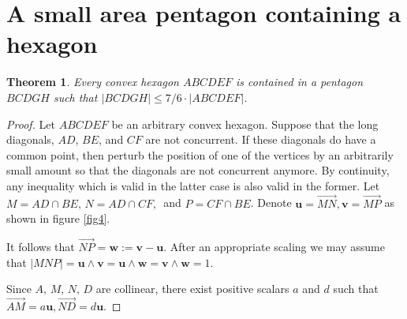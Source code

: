 \documentclass [10pt,oneside]{amsart}
\theoremstyle{definition}
\theoremstyle{plain}
\newtheorem{thm}[df]{Theorem}
\begin{document}
\section{\bf A small area pentagon containing a hexagon}
\begin{thm}\label{thmhexagon}
Every convex hexagon $ABCDEF$ is contained in a pentagon $BCDGH$ such that $|BCDGH| \le 7/6\cdot |ABCDEF|$.
\end{thm}

\begin{proof}
Let $ABCDEF$ be an arbitrary convex hexagon. Suppose that the long
diagonals, $AD$, $BE$, and $CF$ are not concurrent. If these
diagonals do have a common point, then perturb the position of one
of the vertices by an arbitrarily small amount so that the diagonals
are not concurrent anymore. By continuity, any inequality which is
valid in the latter case is also valid in the former.
Let $M=AD\cap BE,\,N=AD\cap CF,\,$ and $P=CF\cap BE$. Denote
$\mathbf{u}=\overrightarrow{MN},
\mathbf{v}=\overrightarrow{MP}$ as shown in figure \ref{fig4}.


It follows that
$\overrightarrow{NP}=\mathbf{w}:=\mathbf{v}-\mathbf{u}$.
After an appropriate scaling we may assume that $|MNP|=
\mathbf{u}\wedge\mathbf{v} = \mathbf{u}\wedge\mathbf{w} = \mathbf{v}\wedge\mathbf{w} =1$.

Since $A,\,M,\,N,\,D$ are collinear, there exist positive scalars $a$ and $d$ such that $\overrightarrow{AM}=a\mathbf{u},
\overrightarrow{ND}=d\mathbf{u}$.


\end{proof}
\end{document}
